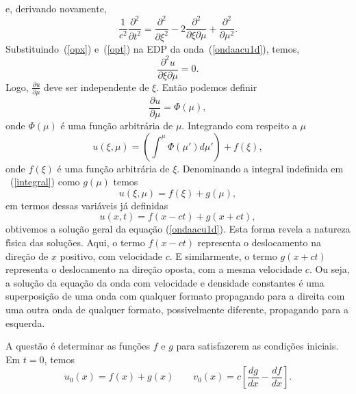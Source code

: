 e, derivando novamente,
\begin{equation}\label{opt}
 \frac{1}{c^2}\frac{\partial ^2}{\partial t^2}=\frac{\partial ^2}
{\partial \xi  ^2}-2\frac{\partial ^2}{\partial \xi \partial \mu}+\frac{\partial ^2}
{\partial \mu ^2}.
\end{equation}
Substituindo~(\ref{opx}) e~(\ref{opt}) na EDP da onda~(\ref{ondaacu1d}), temos,
\begin{equation}
 \frac{\partial ^2u}{\partial \xi \partial \mu}=0.
\end{equation}
Logo, $\frac{\partial u}{\partial \mu}$ deve ser independente de $\xi$. Ent\~ao podemos 
definir
\begin{equation}
 \frac{\partial u}{\partial \mu}=\Phi (\mu),
\end{equation}
onde $\Phi (\mu)$ \'e uma fun\c{c}\~ao arbitr\'aria de $\mu$. Integrando com respeito a $\mu$
\begin{equation}\label{integral}
 u(\xi,\mu)=(\int^\mu \Phi (\mu ')d\mu ')+f(\xi),
\end{equation}
onde $f(\xi)$ \'e uma fun\c{c}\~ao arbitr\'aria de $\xi$.  Denominando a integral indefinida 
em ~(\ref{integral}) como $g(\mu )$ temos
\begin{equation}
 u(\xi,\mu)=f(\xi)+g(\mu),
\end{equation}
em termos dessas vari\'aveis j\'a definidas
\begin{equation}\label{peqonda}
 u(x,t)=f(x-ct)+g(x+ct),
\end{equation}
obtivemos a solu\c{c}\~ao geral da equa\c{c}\~ao (\ref{ondaacu1d}). Esta
forma revela a natureza f\'{\i}sica das solu\c{c}\~oes. Aqui, o termo
$f(x-ct)$ representa o deslocamento na dire\c{c}\~ao de $x$ positivo,
com velocidade $c$. E similarmente, o termo $g(x+ct)$ representa o
deslocamento na dire\c{c}\~ao oposta, com a mesma velocidade $c$. Ou
seja, a solu\c{c}\~ao da equa\c{c}\~ao da onda com velocidade e
densidade constantes \'e uma superposi\c{c}\~ao de uma onda com qualquer
formato propagando para a direita com uma outra onda de qualquer
formato, possivelmente diferente, propagando para a esquerda.

A quest\~ao \'e determinar as fun\c{c}\~oes $f$ e $g$ para satisfazerem
as condi\c{c}\~oes iniciais. Em $t=0$, temos
\begin{equation}
 u_0 (x)=f(x)+g(x)    \qquad   v_0 (x)=c\left[\frac{dg}{dx}-\frac{df}{dx}\right].
 \label{condini}
\end{equation}

